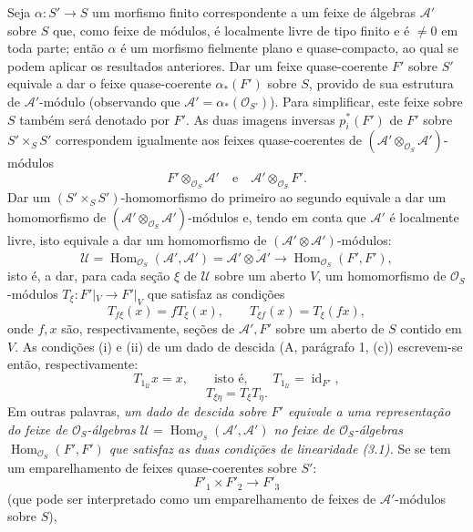 \documentclass[11pt,twoside,openany]{book}
\numberwithin{equation}{section}
\theoremstyle{plain}
\theoremstyle{definition}
\theoremstyle{remark}
\begin{document}
Seja $\alpha:S'\longrightarrow S$ um morfismo finito correspondente a um feixe de
álgebras $\mathcal A'$ sobre $S$ que, como feixe de módulos, é localmente livre
de tipo finito e é $\ne0$ em toda parte; então $\alpha$ é um morfismo
fielmente plano e quase-compacto, ao qual se podem aplicar os resultados
anteriores. Dar um feixe quase-coerente $F'$ sobre $S'$ equivale a dar o feixe
quase-coerente $\alpha_*(F')$ sobre $S$, provido de sua estrutura de
$\mathcal A'$-módulo (observando que
$\mathcal A'=\alpha_*(\mathcal O_{S'})$). Para simplificar, este feixe sobre $S$
também será denotado por $F'$. As duas imagens inversas $p_i^*(F')$ de $F'$
sobre $S'\times_SS'$ correspondem igualmente aos feixes quase-coerentes de
$(\mathcal A'\otimes_{\mathcal O_S}\mathcal A')$-módulos
\[
  F'\otimes_{\mathcal O_S}\mathcal A'
  \quad\text{e}\quad
  \mathcal A'\otimes_{\mathcal O_S}F'.
\]
Dar um $(S'\times_SS')$-homomorfismo do primeiro ao segundo equivale a dar um
homomorfismo de $(\mathcal A'\otimes_{\mathcal O_S}\mathcal A')$-módulos e,
tendo em conta que $\mathcal A'$ é localmente livre, isto equivale a dar
um homomorfismo de $(\mathcal A'\otimes\mathcal A')$-módulos:
\[
  \mathcal U=
  \operatorname{Hom}_{\mathcal O_S}(\mathcal A',\mathcal A')
  =\mathcal A'\otimes\check{\mathcal A}'
  \longrightarrow
  \operatorname{Hom}_{\mathcal O_S}(F',F'),
\]
isto é, a dar, para cada seção $\xi$ de $\mathcal U$ sobre um aberto $V$,
um homomorfismo de $\mathcal O_S$-módulos
$T_\xi:F'|_V\longrightarrow F'|_V$ que satisfaz as condições
\begin{equation}
  T_{f\xi}(x)=fT_\xi(x),
  \qquad T_{\xi f}(x)=T_\xi(fx),
  \tag{3.1}
\end{equation}
onde $f,x$ são, respectivamente, seções de $\mathcal A',F'$ sobre um
aberto de $S$ contido em $V$. As condições (i) e (ii) de um dado de
descida (A, parágrafo 1, (c)) escrevem-se então, respectivamente:
\begin{equation}
  T_{1_{\mathcal U}}x=x,
  \qquad\text{isto é,}\qquad
  T_{1_{\mathcal U}}=\operatorname{id}_{F'},
  \tag{3.2}
\end{equation}
\begin{equation}
  T_{\xi\eta}=T_\xi T_\eta.
  \tag{3.3}
\end{equation}
Em outras palavras, \emph{um dado de descida sobre $F'$ equivale a uma
representação do feixe de $\mathcal O_S$-álgebras
$\mathcal U=\operatorname{Hom}_{\mathcal O_S}(\mathcal A',\mathcal A')$ no
feixe de $\mathcal O_S$-álgebras
$\operatorname{Hom}_{\mathcal O_S}(F',F')$ que satisfaz as duas condições de
linearidade (3.1).} Se se tem um emparelhamento de feixes quase-coerentes sobre
$S'$:
\[
  F'_1\times F'_2\longrightarrow F'_3
\]
(que pode ser interpretado como um emparelhamento de feixes de
$\mathcal A'$-módulos sobre $S$),
\end{document}
